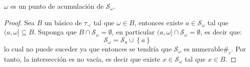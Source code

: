 \documentclass[12pt]{report}
\theoremstyle{largebreak}
\newcommand\contradiction{\ensuremath{\#_c}}
\begin{document}
    \begin{propo}
        $\omega$ es un punto de acumulación de $\mathcal{S}_\omega$.
    \end{propo}

    \begin{proof}
        Sea $B$ un básico de $\tau_\prec$ tal que $\omega\in B$, entonces existe $a\in\mathcal{S}_\omega$ tal que $(a,\omega]\subseteq B$. Suponga que $B\cap \mathcal{S}_\omega=\emptyset$, en particular $(a,\omega]\cap\mathcal{S}_\omega=\emptyset$, es decir que:
        \begin{equation*}
            \mathcal{S}_\omega=\mathcal{S}_a\cup\left\{a\right\}
        \end{equation*}
        lo cual no puede suceder ya que entonces se tendría que $\mathcal{S}_\omega$ es numerable\contradiction. Por tanto, la intersección es no vacía, es decir que existe $x\in \mathcal{S}_\omega$ tal que $x\in B$.
    \end{proof}
\end{document}
